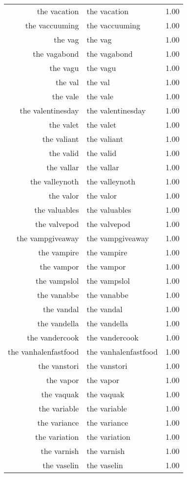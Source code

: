 \begin{table}[ht]
\begin{tabular}{rlr}
  the vacation & the vacation & 1.00 \\ 
  the vaccuuming & the vaccuuming & 1.00 \\ 
  the vag & the vag & 1.00 \\ 
  the vagabond & the vagabond & 1.00 \\ 
  the vagu & the vagu & 1.00 \\ 
  the val & the val & 1.00 \\ 
  the vale & the vale & 1.00 \\ 
  the valentinesday & the valentinesday & 1.00 \\ 
  the valet & the valet & 1.00 \\ 
  the valiant & the valiant & 1.00 \\ 
  the valid & the valid & 1.00 \\ 
  the vallar & the vallar & 1.00 \\ 
  the valleynoth & the valleynoth & 1.00 \\ 
  the valor & the valor & 1.00 \\ 
  the valuables & the valuables & 1.00 \\ 
  the valvepod & the valvepod & 1.00 \\ 
  the vampgiveaway & the vampgiveaway & 1.00 \\ 
  the vampire & the vampire & 1.00 \\ 
  the vampor & the vampor & 1.00 \\ 
  the vampslol & the vampslol & 1.00 \\ 
  the vanabbe & the vanabbe & 1.00 \\ 
  the vandal & the vandal & 1.00 \\ 
  the vandella & the vandella & 1.00 \\ 
  the vandercook & the vandercook & 1.00 \\ 
  the vanhalenfastfood & the vanhalenfastfood & 1.00 \\ 
  the vanstori & the vanstori & 1.00 \\ 
  the vapor & the vapor & 1.00 \\ 
  the vaquak & the vaquak & 1.00 \\ 
  the variable & the variable & 1.00 \\ 
  the variance & the variance & 1.00 \\ 
  the variation & the variation & 1.00 \\ 
  the varnish & the varnish & 1.00 \\ 
  the vaselin & the vaselin & 1.00 \\ 

\end{tabular}
\end{table}
